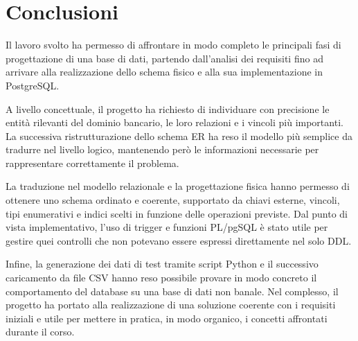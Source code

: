 
\section{Conclusioni}
Il lavoro svolto ha permesso di affrontare in modo completo le principali fasi di progettazione di una base di dati, partendo dall'analisi dei requisiti fino ad arrivare alla realizzazione dello schema fisico e alla sua implementazione in PostgreSQL.

A livello concettuale, il progetto ha richiesto di individuare con precisione le entità rilevanti del dominio bancario, le loro relazioni e i vincoli più importanti. La successiva ristrutturazione dello schema ER ha reso il modello più semplice da tradurre nel livello logico, mantenendo però le informazioni necessarie per rappresentare correttamente il problema.

La traduzione nel modello relazionale e la progettazione fisica hanno permesso di ottenere uno schema ordinato e coerente, supportato da chiavi esterne, vincoli, tipi enumerativi e indici scelti in funzione delle operazioni previste. Dal punto di vista implementativo, l'uso di trigger e funzioni PL/pgSQL è stato utile per gestire quei controlli che non potevano essere espressi direttamente nel solo DDL.

Infine, la generazione dei dati di test tramite script Python e il successivo caricamento da file CSV hanno reso possibile provare in modo concreto il comportamento del database su una base di dati non banale. Nel complesso, il progetto ha portato alla realizzazione di una soluzione coerente con i requisiti iniziali e utile per mettere in pratica, in modo organico, i concetti affrontati durante il corso.
